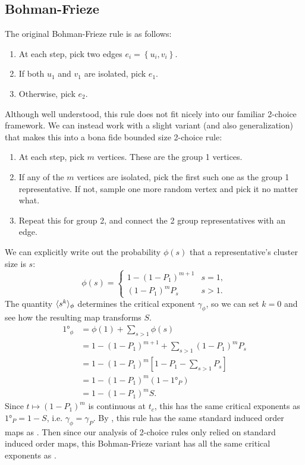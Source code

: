\documentclass[twoside,10pt]{article}
\newcommand{\BF}{Bohman-Frieze\xspace}
\begin{document}
\subsection{Bohman-Frieze}

The original \BF rule is as follows:
\begin{enumerate}
        \item At each step, pick two edges $e_i = \left\{ u_i, v_i \right\}$.
        \item If both $u_1$ and $v_1$ are isolated, pick $e_1$.
        \item Otherwise, pick $e_2$.
\end{enumerate}
Although well understood, this rule does not fit nicely into our familiar 2-choice framework. We can instead work with a slight variant (and also generalization) that makes this into a bona fide bounded size 2-choice rule:
\begin{enumerate}
        \item At each step, pick $m$ vertices. These are the group 1 vertices.         \item If any of the $m$ vertices are isolated, pick the first such one as the group 1 representative. If not, sample one more random vertex and pick it no matter what.
        \item Repeat this for group 2, and connect the 2 group representatives with an edge.
\end{enumerate}
We can explicitly write out the probability $\phi(s)$ that a representative's cluster size is $s$:
\[
        \phi(s)=
        \begin{cases}
                1 - (1-P_1)^{m+1} & s = 1, \\
                (1-P_1)^{m}P_s & s > 1.
        \end{cases}
\]
The quantity $\langle s^{k} \rangle_{\phi}$ determines the critical exponent $\gamma_{\phi}$, so we can set $k=0$ and see how the resulting map transforms $S$.
\begin{align*}
        \ang{1}_{\phi} &= \phi(1) + \sum_{s > 1} \phi(s) \\
                       &= 1 - (1-P_1)^{m+1} + \sum_{s>1}(1-P_1)^{m}P_s \\
                       &= 1 - (1-P_1)^{m} \left[ 1 - P_1 - \sum_{s>1}P_s \right] \\
                       &= 1 - (1-P_1)^{m} (1-\ang{1}_{P}) \\
                       &= 1 - (1-P_1)^{m} S.
\end{align*}
Since $t \mapsto (1-P_1)^{m}$ is continuous at $t_c$, this has the same critical exponents as $\ang{1}_{P} = 1-S$, i.e. $\gamma_{\phi} = \gamma_{P}$. By , this rule has the same standard induced order maps as \ER. Then since our analysis of 2-choice rules only relied on standard induced order maps, this \BF variant has all the same critical exponents as \ER.
\end{document}

